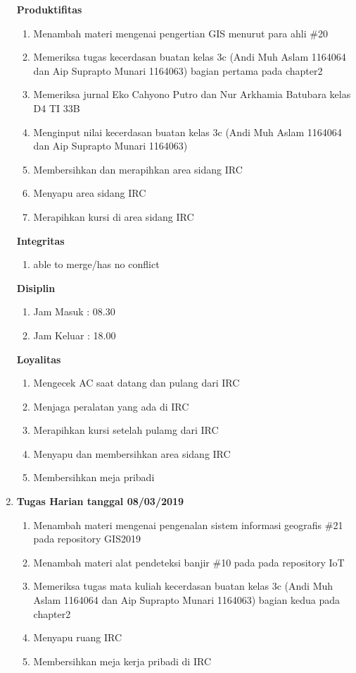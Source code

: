 \begin{enumerate}
\textbf{Produktifitas}
\begin{enumerate}
\item Menambah materi mengenai pengertian GIS menurut para ahli \#20
\item Memeriksa tugas kecerdasan buatan kelas 3c (Andi Muh Aslam 1164064 dan Aip Suprapto Munari 1164063) bagian pertama pada chapter2
\item Memeriksa jurnal Eko Cahyono Putro dan Nur Arkhamia Batubara kelas D4 TI 33B
\item Menginput nilai kecerdasan buatan kelas 3c (Andi Muh Aslam 1164064 dan Aip Suprapto Munari 1164063)
\item Membersihkan dan merapihkan area sidang IRC
\item Menyapu area sidang IRC
\item Merapihkan kursi di area sidang IRC
\end{enumerate}

\textbf{Integritas}
\begin{enumerate}
\item able to merge/has no conflict
\end{enumerate}


\textbf{Disiplin}
\begin{enumerate}
\item Jam Masuk : 08.30
\item Jam Keluar : 18.00
\end{enumerate}


\textbf{Loyalitas}
\begin{enumerate}
\item Mengecek AC saat datang dan pulang dari IRC
\item Menjaga peralatan yang ada di IRC
\item Merapihkan kursi setelah pulamg dari IRC
\item Menyapu dan membersihkan area sidang IRC
\item Membersihkan meja pribadi
\end{enumerate}

\item \textbf{Tugas Harian tanggal 08/03/2019}
\begin{enumerate}
\item Menambah materi mengenai pengenalan sistem informasi geografis \#21 pada repository GIS2019
\item Menambah materi alat pendeteksi banjir \#10 pada pada repository IoT 
\item Memeriksa tugas mata kuliah kecerdasan buatan kelas 3c (Andi Muh Aslam 1164064 dan Aip Suprapto Munari 1164063) bagian kedua pada chapter2
\item Menyapu ruang IRC
\item Membersihkan meja kerja pribadi di IRC
\end{enumerate}


\end{enumerate}
